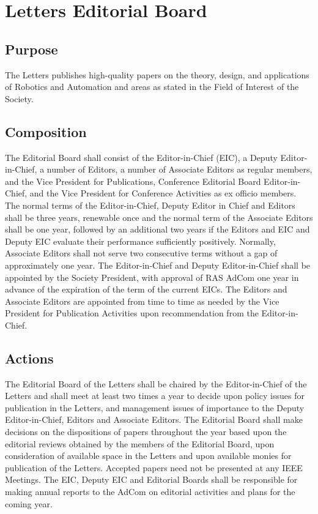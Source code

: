 \documentclass[10pt]{article}
\begin{document}
\section{Letters Editorial Board}
\label{LEB}

\subsection{Purpose}
The Letters publishes high-quality papers on the theory, design, and applications of Robotics and Automation and areas as stated in the Field of Interest of the Society.


\subsection{Composition}
\label{LEB:Composition}

The Editorial Board shall consist of the Editor-in-Chief (EIC), a Deputy Editor-in-Chief, a number of Editors, a number of Associate Editors as regular members, and the Vice President for Publications, Conference Editorial Board Editor-in-Chief, and the Vice President for Conference Activities as ex officio members.  The normal terms of the Editor-in-Chief, Deputy Editor in Chief and Editors shall be three years, renewable once and the normal term of the Associate Editors shall be one year, followed by an additional two years if the Editors and EIC and Deputy EIC evaluate their performance sufficiently positively. Normally, Associate Editors shall not serve two consecutive terms without a gap of approximately one year.  The Editor-in-Chief and Deputy Editor-in-Chief shall be appointed by the Society President, with approval of RAS AdCom one year in advance of the expiration of the term of the current EICs. The Editors and Associate Editors are appointed from time to time as needed by the Vice President for Publication Activities upon recommendation from the Editor-in-Chief.


\subsection{Actions}

The Editorial Board of the Letters shall be chaired by the Editor-in-Chief of the Letters and shall meet at least two times a year to decide upon policy issues for publication in the Letters, and management issues of importance to the Deputy Editor-in-Chief, Editors and Associate Editors.  The Editorial Board shall make decisions on the dispositions of papers throughout the year based upon the editorial reviews obtained by the members of the Editorial Board, upon consideration of available space in the Letters and upon available monies for publication of the Letters.  Accepted papers need not be presented at any IEEE Meetings. The EIC, Deputy EIC and Editorial Boards shall be responsible for making annual reports to the AdCom on editorial activities and plans for the coming year.
\end{document}
